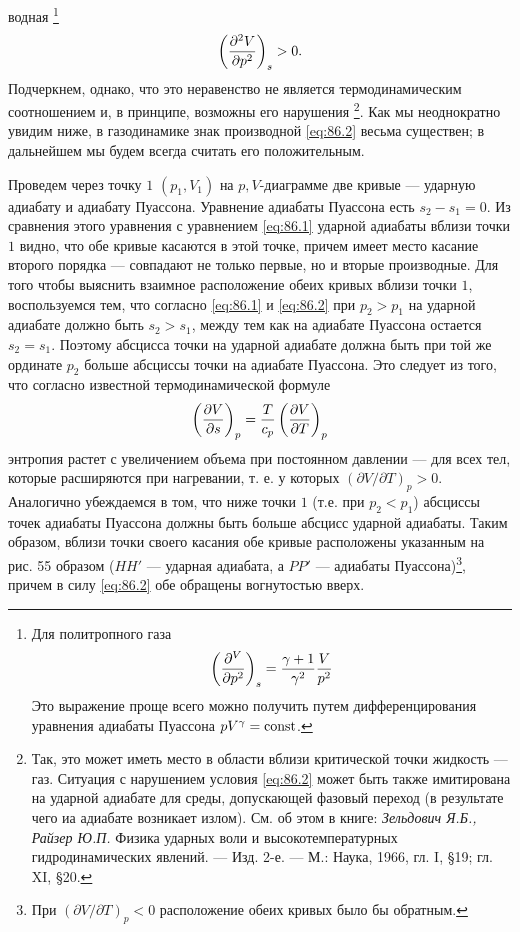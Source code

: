 водная \footnote{
Для политропного газа
\[
	\left( \frac{\partial{^V}}{\partial{p^2}} \right)_{s} = \frac{\gamma+1}{\gamma^2} \frac{V}{p^2}
\]
Это выражение проще всего можно получить путем дифференцирования уравнения
адиабаты Пуассона $pV^\gamma=\mathop{\mathrm{const}}\nolimits $.
}
\begin{equation}
	\label{eq:86.2}
	\left( \frac{\partial{^2V}}{\partial{p^2}} \right)_{s}>0.
\end{equation}
Подчеркнем, однако, что это неравенство не является термодинамическим
соотношением и, в принципе, возможны его нарушения \footnote{Так, это может
иметь место в области вблизи критической точки жидкость — газ. Ситуация с
нарушением условия \ref{eq:86.2} может быть также имитирована на ударной
адиабате для среды, допускающей фазовый переход (в результате чего иа адиабате
возникает излом). См. об этом в книге: \emph{Зельдович Я.Б., Райзер Ю.П.} Физика
ударных воли и высокотемпературных гидродинамических явлений. — Изд. 2-е. — М.:
Наука, 1966, гл. I, \S 19; гл. XI, \S 20.}. Как мы неоднократно
увидим ниже, в газодинамике знак производной \ref{eq:86.2} весьма существен; в
дальнейшем мы будем всегда считать его положительным.

Проведем через точку $1$ $(p_1,V_1)$ на $p,V$-диаграмме две кривые — ударную
адиабату и адиабату Пуассона. Уравнение адиабаты Пуассона есть $s_2-s_1=0$. Из
сравнения этого уравнения с уравнением \ref{eq:86.1} ударной адиабаты вблизи
точки $1$ видно, что обе кривые касаются в этой точке, причем имеет место
касание второго порядка — совпадают не только первые, но и вторые производные.
Для того чтобы выяснить взаимное расположение обеих кривых вблизи точки $1$,
воспользуемся тем, что согласно \ref{eq:86.1} и \ref{eq:86.2} при $p_2>p_1$ на
ударной адиабате должно быть $s_2>s_1$, между тем как на адиабате Пуассона
остается $s_2=s_1$. Поэтому абсцисса точки на ударной адиабате должна быть при
той же ординате $p_2$ больше абсциссы точки на адиабате Пуассона. Это следует
из того, что согласно известной термодинамической формуле
\[
	\left( \frac{\partial{V}}{\partial{s}} \right)_{p} = \frac{T}{c_p}\left( \frac{\partial{V}}{\partial{T}} \right)_{p}
\]
энтропия растет с увеличением объема при постоянном давлении — для всех тел,
которые расширяются при нагревании, т. е. у которых $(\partial V/\partial
T)_p>0$. Аналогично убеждаемся в том, что ниже точки $1$ (т.е. при $p_2<p_1$)
абсциссы точек адиабаты Пуассона должны быть больше абсцисс ударной адиабаты.
Таким образом, вблизи точки своего касания обе кривые расположены указанным на
рис. 55 образом ($HH'$ — ударная адиабата, а $PP'$ — адиабаты
Пуассона)\footnote{При $(\partial V/\partial T)_p < 0$ расположение обеих
кривых было бы обратным.}, причем в силу \ref{eq:86.2} обе обращены вогнутостью
вверх.



